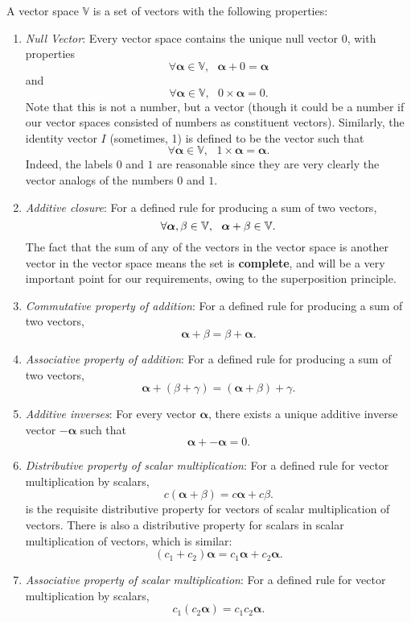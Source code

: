 \\\\
A vector space $\mathbb{V}$ is a set of vectors with the following properties:
\begin{enumerate}
    \item \textit{Null Vector}: Every vector space contains the unique null vector $0$, with properties
    $$
    \forall \bm{\alpha} \in \mathbb{V}, \:\:\: \bm{\alpha} + 0 = \bm{\alpha}
    $$
    and
    $$
    \forall \bm{\alpha} \in \mathbb{V}, \:\:\: 0\times\bm{\alpha} = 0.
    $$
    Note that this is not a number, but a vector (though it could be a number if our vector spaces consisted of numbers as constituent vectors). Similarly, the identity vector $I$ (sometimes, 1) is defined to be the vector such that
    $$
    \forall \bm{\alpha} \in \mathbb{V}, \:\:\: 1\times\bm{\alpha} = \bm{\alpha}.
    $$
    Indeed, the labels $0$ and $1$ are reasonable since they are very clearly the vector analogs of the numbers $0$ and $1$.
    \item \textit{Additive closure}: For a defined rule for producing a sum of two vectors, 
    $$
    \forall \bm{\alpha},\beta\in\mathbb{V}, \:\:\: \bm{\alpha} + \beta \in \mathbb{V}.
    $$
    The fact that the sum of any of the vectors in the vector space is another vector in the vector space means the set is \textbf{complete}, and will be a very important point for our requirements, owing to the superposition principle.
    \item \textit{Commutative property of addition}: For a defined rule for producing a sum of two vectors, 
    $$
    \bm{\alpha} + \beta =  \beta +  \bm{\alpha}.
    $$
    \item \textit{Associative property of addition}: For a defined rule for producing a sum of two vectors, 
    $$
    \bm{\alpha} + (\beta +\gamma) =  (\bm{\alpha} + \beta) +\gamma.
    $$
    \item \textit{Additive inverses}: For every vector $\bm{\alpha}$, there exists a unique additive inverse vector $-\bm{\alpha}$ such that
    $$
    \bm{\alpha} + -\bm{\alpha} = 0.
    $$
    \item \textit{Distributive property of scalar multiplication}: For a defined rule for vector multiplication by scalars, 
    $$
    c(\bm{\alpha}+ \beta) = c\bm{\alpha} + c\beta.
    $$ 
    is the requisite distributive property for vectors of scalar multiplication of vectors. There is also a distributive property for scalars in scalar multiplication of vectors, which is similar:
    $$
    (c_1+c_2)\bm{\alpha} = c_1\bm{\alpha} + c_2 \bm{\alpha}.
    $$
    \item \textit{Associative property of scalar multiplication}: For a defined rule for vector multiplication by scalars, 
    $$
    c_1(c_2\bm{\alpha})=c_1c_2\bm{\alpha}.
    $$
\end{enumerate} 
